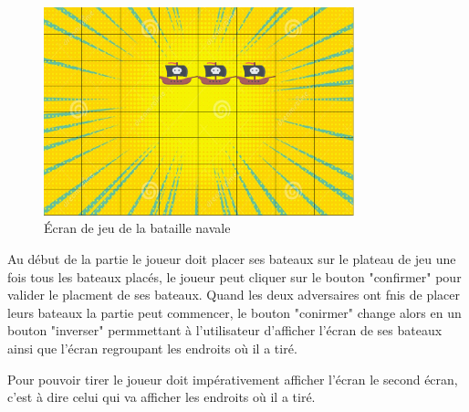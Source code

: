\documentclass{report}
\begin{document}
\begin{figure}[H]
	\centering\includegraphics[width=9cm]{notreBataille}
	\caption{Écran de jeu de la bataille navale}
    \label{notreBataille}
\end{figure}

Au début de la partie le joueur doit placer ses bateaux sur le plateau de jeu une fois
tous les bateaux placés, le joueur peut cliquer sur le bouton "confirmer" pour valider le placment de ses bateaux.
Quand les deux adversaires ont fnis de placer leurs bateaux la partie peut commencer, le bouton "conirmer" change alors en un
bouton "inverser" permmettant à l'utilisateur d'afficher l'écran de ses bateaux ainsi que l'écran regroupant les endroits où il a tiré.

Pour pouvoir tirer le joueur doit impérativement afficher l'écran le second écran, c'est à dire celui qui va afficher les endroits où il a tiré.
\end{document}
